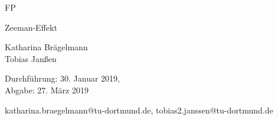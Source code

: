 \newcommand{\Titel}{Zeeman-Effekt}
\newcommand{\DatumDu}{30. Januar 2019}
\newcommand{\DatumAb}{27. März 2019}
\newcommand{\Autoreins}{Katharina Brägelmann}
\newcommand{\Emaileins}{katharina.braegelmann@tu-dortmund.de}
\newcommand{\Autorzwei}{Tobias Janßen}
\newcommand{\Emailzwei}{tobias2.janssen@tu-dortmund.de}



\begin{titlepage}

\begin{center} \large

  FP
  \vspace*{2.5cm}

  {\huge \Titel}
  \vspace*{3cm}

  \Autoreins
  \\\Autorzwei
  \vspace*{1.5cm}

  Durchführung: \DatumDu,\\
  Abgabe: \DatumAb
  \vspace*{10cm}


  \Emaileins, \Emailzwei


\end{center}
\end{titlepage}

